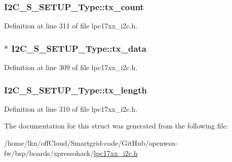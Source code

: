 \subsubsection[{\texorpdfstring{tx\+\_\+count}{tx_count}}]{ I2\+C\+\_\+\+S\+\_\+\+S\+E\+T\+U\+P\+\_\+\+Type\+::tx\+\_\+count}\hypertarget{struct_i2_c___s___s_e_t_u_p___type_a968b88959698082dad533dd81e43656c}{}\label{struct_i2_c___s___s_e_t_u_p___type_a968b88959698082dad533dd81e43656c}


Definition at line 311 of file lpc17xx\+\_\+i2c.\+h.

\subsubsection[{\texorpdfstring{tx\+\_\+data}{tx_data}}]{$\ast$ I2\+C\+\_\+\+S\+\_\+\+S\+E\+T\+U\+P\+\_\+\+Type\+::tx\+\_\+data}\hypertarget{struct_i2_c___s___s_e_t_u_p___type_a229ec9ad1b82bcaf5e71630f63b665ad}{}\label{struct_i2_c___s___s_e_t_u_p___type_a229ec9ad1b82bcaf5e71630f63b665ad}


Definition at line 309 of file lpc17xx\+\_\+i2c.\+h.

\subsubsection[{\texorpdfstring{tx\+\_\+length}{tx_length}}]{ I2\+C\+\_\+\+S\+\_\+\+S\+E\+T\+U\+P\+\_\+\+Type\+::tx\+\_\+length}\hypertarget{struct_i2_c___s___s_e_t_u_p___type_ad21f72ab1857d2701a3ebfd2a925dbb8}{}\label{struct_i2_c___s___s_e_t_u_p___type_ad21f72ab1857d2701a3ebfd2a925dbb8}


Definition at line 310 of file lpc17xx\+\_\+i2c.\+h.



The documentation for this struct was generated from the following file\+:\begin{DoxyCompactItemize}
\item 
/home/lkn/off\+Cloud/\+Smartgrid-\/code/\+Git\+Hub/openwsn-\/fw/bsp/boards/xpressohack/\hyperlink{lpc17xx__i2c_8h}{lpc17xx\+\_\+i2c.\+h}\end{DoxyCompactItemize}
